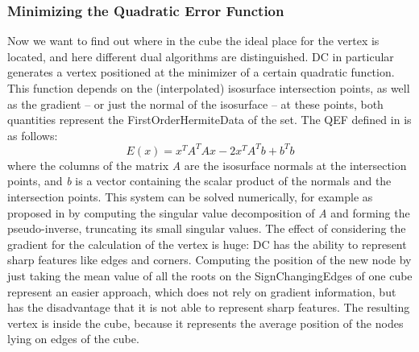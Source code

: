 \subsubsection{Minimizing the Quadratic Error Function}
Now we want to find out where in the cube the ideal place for the vertex is located, and here different dual algorithms are distinguished. \Ac{DC} in particular generates a vertex positioned at the minimizer of a certain quadratic function. This function depends on the (interpolated) isosurface intersection points, as well as the gradient -- or just the normal of the isosurface -- at these points, both quantities represent the \acs{FirstOrderHermiteData} of the set.
The \acl{QEF} defined in \cite{Hermite2002} is as follows:
\begin{equation}
\label{eq:QEF}
E(x)= x^TA^TAx-2x^TA^Tb+b^Tb
\end{equation}
where the columns of the matrix \textit{A} are the  isosurface normals at the intersection points, and \textit{b} is a vector containing the scalar product of the normals and the intersection points. This system can be solved numerically, for example as proposed in \cite{Hermite2002} by computing the singular value decomposition of \textit{A} and forming the pseudo-inverse, truncating its small singular values. 
The effect of considering the gradient for the calculation of the vertex is huge: \ac{DC} has the ability to represent sharp features like edges and corners.
Computing the position of the new node by just taking the mean value of all the roots on the \acsp{SignChangingEdge} of one cube represent an easier approach, which does not rely on gradient information, but has the disadvantage that it is not able to represent sharp features. The resulting vertex is inside the cube, because it represents the average position of the nodes lying on edges of the cube.

